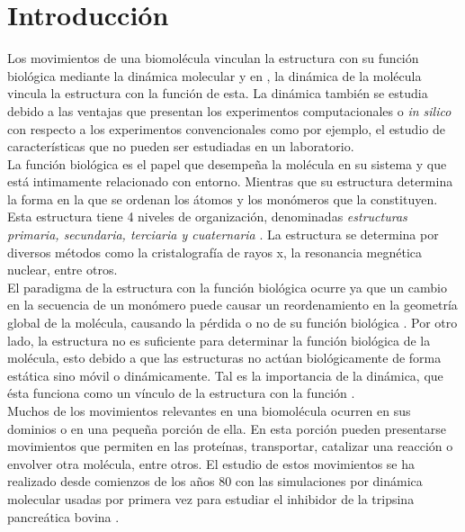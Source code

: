 \chapter*{Introducci\'{o}n}\label{ch:1}
Los movimientos de una biomol\'{e}cula vinculan la estructura con su funci\'{o}n biol\'{o}gica mediante la din\'{a}mica molecular \cite{Lezon2009} y en  \cite{Rader2006}, la din\'{a}mica de la mol\'{e}cula vincula la estructura con la funci\'{o}n de esta. La din\'{a}mica tambi\'{e}n se estudia debido a las ventajas que presentan los experimentos computacionales o \textit{in silico} con respecto a los experimentos convencionales como por ejemplo, el estudio de caracter\'{i}sticas que no pueden ser estudiadas en un laboratorio.\\

La funci\'{o}n biol\'{o}gica es el papel que desempe\~{n}a la mol\'{e}cula en su sistema y que est\'{a} intimamente relacionado con entorno. Mientras que su estructura determina la forma en la que se ordenan los \'{a}tomos y los mon\'{o}meros que la constituyen. Esta estructura tiene 4 niveles de organizaci\'{o}n, denominadas \textit{estructuras primaria, secundaria, terciaria y cuaternaria} \cite{Kuchel}. La estructura se determina por diversos m\'{e}todos como la cristalograf\'{i}a de rayos x, la resonancia megn\'{e}tica nuclear, entre otros.\\

El paradigma de la estructura con la funci\'{o}n biol\'{o}gica ocurre ya que un cambio en la secuencia de un mon\'{o}mero puede causar un reordenamiento en la geometr\'{i}a global de la mol\'{e}cula, causando la p\'{e}rdida o no de su funci\'{o}n biol\'{o}gica \cite{Dykeman2010NormalPhysics}. Por otro lado, la estructura no es suficiente para determinar la funci\'{o}n biol\'{o}gica de la mol\'{e}cula, esto debido a que las estructuras no act\'{u}an biol\'{o}gicamente de forma est\'{a}tica sino m\'{o}vil o din\'{a}micamente. Tal es  la importancia de la din\'{a}mica, que \'{e}sta funciona como un v\'{i}nculo de la estructura con la funci\'{o}n \cite{Bahar2005Coarse-grainedBiology}.\\

Muchos de los movimientos relevantes en una biomol\'{e}cula ocurren en sus dominios o en una peque\~{n}a porci\'{o}n de ella. En esta porci\'{o}n pueden presentarse movimientos que permiten en las prote\'{i}nas, transportar, catalizar una reacci\'{o}n o envolver otra mol\'{e}cula, entre otros. El estudio de estos movimientos se ha realizado desde comienzos de los a\~{n}os 80 con las simulaciones por din\'{a}mica molecular usadas por primera vez para estudiar el inhibidor de la tripsina pancre\'{a}tica bovina  \cite{Bahar2005Coarse-grainedBiology}.\\

